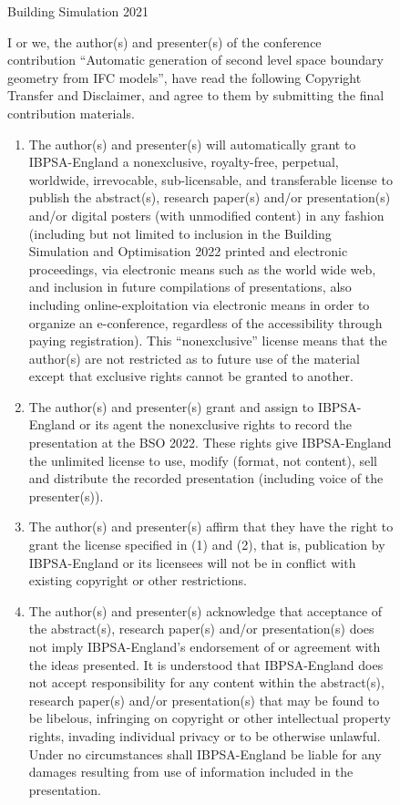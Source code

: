 \documentclass[twocolumn, a4paper,10pt]{article}
\begin{document}
\begin{figure}[ht]
\centering
\begin{boxedminipage}{\textwidth}
Building Simulation 2021
 
I or we, the author(s) and presenter(s) of the conference contribution ``Automatic generation of second level space boundary geometry from IFC models'', have read the following Copyright Transfer and Disclaimer, and agree to them by submitting the final contribution materials.
 
 \begin{enumerate}
 \item The author(s) and presenter(s) will automatically grant to IBPSA-England a nonexclusive, royalty-free, perpetual, worldwide, irrevocable, sub-licensable, and transferable license to publish the abstract(s), research paper(s) and/or presentation(s) and/or digital posters (with unmodified content) in any fashion (including but not limited to inclusion in the Building Simulation and Optimisation 2022 printed and electronic proceedings, via electronic means such as the world wide web, and inclusion in future compilations of presentations, also including online-exploitation via electronic means in order to organize an e-conference, regardless of the accessibility through paying registration). This ``nonexclusive'' license means that the author(s) are not restricted as to future use of the material except that exclusive rights cannot be granted to another.
 
\item The author(s) and presenter(s) grant and assign to IBPSA-England or its agent the nonexclusive rights to record the presentation at the BSO 2022. These rights give IBPSA-England the unlimited license to use, modify (format, not content), sell and distribute the recorded presentation (including voice of the presenter(s)).
 
\item The author(s) and presenter(s) affirm that they have the right to grant the license specified in (1) and (2), that is, publication by IBPSA-England or its licensees will not be in conflict with existing copyright or other restrictions.
 
\item The author(s) and presenter(s) acknowledge that acceptance of the abstract(s), research paper(s) and/or presentation(s) does not imply IBPSA-England's endorsement of or agreement with the ideas presented. It is understood that IBPSA-England does not accept responsibility for any content within the abstract(s), research paper(s) and/or presentation(s) that may be found to be libelous, infringing on copyright or other intellectual property rights, invading individual privacy or to be otherwise unlawful. Under no circumstances shall IBPSA-England be liable for any damages resulting from use of information included in the presentation.
 

\end{enumerate}
\end{boxedminipage}
\end{figure}
\end{document}
